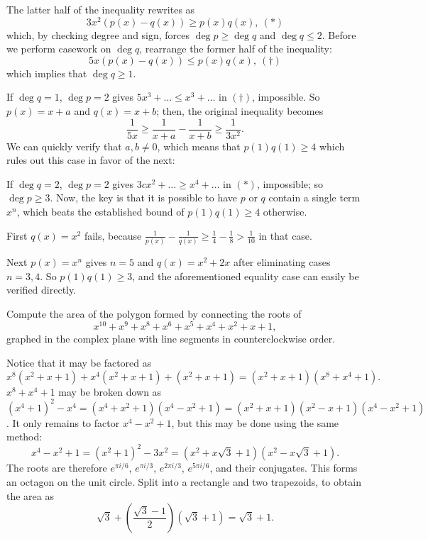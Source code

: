 \begin{solution}[name={Solution by peace09}]
	The latter half of the inequality rewrites as
	\[3x^2(p(x)-q(x))\ge p(x)q(x),~(\ast)\]which, by checking degree and sign, forces $\deg p\ge\deg q$ and $\deg q\le 2$. Before we perform casework on $\deg q$, rearrange the former half of the inequality:
	\[5x(p(x)-q(x))\le p(x)q(x),~(\dagger)\]which implies that $\deg q\ge 1$.
	
	If $\deg q=1$, $\deg p=2$ gives $5x^3+\dots\le x^3+\dots$ in $(\dagger)$, impossible. So $p(x)=x+a$ and $q(x)=x+b$; then, the original inequality becomes
	\[\frac{1}{5x}\ge\frac{1}{x+a}-\frac{1}{x+b}\ge\frac{1}{3x^2}.\]We can quickly verify that $a,b\neq0$, which means that $p(1)q(1)\ge4$ which rules out this case in favor of the next:
	
	If $\deg q=2$, $\deg p=2$ gives $3cx^2+\dots\ge x^4+\dots$ in $(\ast)$, impossible; so $\deg p\ge 3$. Now, the key is that it is possible to have $p$ or $q$ contain a single term $x^n$, which beats the established bound of $p(1)q(1)\ge4$ otherwise.
	
	First $q(x)=x^2$ fails, because $\tfrac{1}{p(x)}-\tfrac{1}{q(x)}\ge\tfrac{1}{4}-\tfrac{1}{8}>\tfrac{1}{10}$ in that case.
	
	Next $p(x)=x^n$ gives $n=5$ and $q(x)=x^2+2x$ after eliminating cases $n=3,4$. So $p(1)q(1)\ge\boxed{3}$, and the aforementioned equality case can easily be verified directly.
\end{solution}




\begin{question}[name={2023 Stanford Math Tournament, \href{https://artofproblemsolving.com/community/c383h3065230p27653938}{Algebra Tiebreaker \#1}}]
	Compute the area of the polygon formed by connecting the roots of
	\[x^{10} + x^9 + x^8 + x^6 + x^5 + x^4 + x^2 + x + 1,\]graphed in the complex plane with line segments in counterclockwise order.
\end{question}

\begin{solution}[name={Solution by gracemoon124}]
	Notice that it may be factored as
	\[x^8(x^2+x+1)+x^4(x^2+x+1)+(x^2+x+1)=(x^2+x+1)(x^8+x^4+1).\]$x^8+x^4+1$ may be broken down as $(x^4+1)^2-x^4=(x^4+x^2+1)(x^4-x^2+1)=(x^2+x+1)(x^2-x+1)(x^4-x^2+1)$.
	It only remains to factor $x^4-x^2+1$, but this may be done using the same method:
	\[x^4-x^2+1=(x^2+1)^2-3x^2=(x^2+x\sqrt{3}+1)(x^2-x\sqrt{3}+1).\]The roots are therefore $e^{\pi i/6}$, $e^{\pi i/3}$, $e^{2\pi i/3}$, $e^{5\pi i/6}$, and their conjugates.
	This forms an octagon on the unit circle.
	Split into a rectangle and two trapezoids, to obtain the area as
	\[\sqrt{3}+\left(\frac{\sqrt{3}-1}{2}\right)(\sqrt{3}+1)=\boxed{\sqrt{3}+1}.\]
\end{solution}


